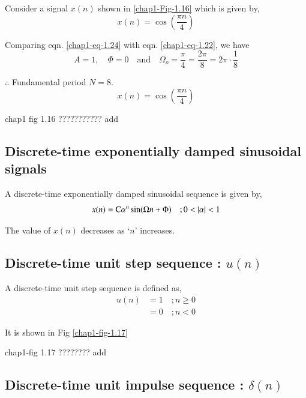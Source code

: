 Consider a signal $x(n)$ shown in \ref{chap1-Fig-1.16} which is given by,
\begin{equation}
x(n)= \cos\left(\dfrac{\pi n}{4}\right)\label{chap1-eq-1.24}
\end{equation}

Comparing eqn. \ref{chap1-eq-1.24} with eqn. \ref{chap1-eq-1.22}, we have
$$
A = 1, \quad \Phi = 0 \quad \text{and}\quad \Omega_{o} = \dfrac{\pi}{4} = \dfrac{2\pi}{ 8} = 2\pi\cdot \dfrac{1}{8} 
$$

$\therefore$ Fundamental period $N = 8$.
$$
x(n)= \cos \left(\dfrac{\pi n}{4} \right)
$$

\begin{center}
 chap1 fig 1.16 ??????????? add
\end{center}


\subsection{Discrete-time exponentially damped sinusoidal signals}\label{chap1-subsec-1.4.3}

A discrete-time exponentially damped sinusoidal sequence  is given by,
\begin{equation}
x(n) = \textrm{C} \alpha^{n} \sin(\Omega n + \Phi) \quad ; 0 < |\alpha| < 1 \label{chap1-eq-1.25}
\end{equation}

The value of $x(n)$ decreases as `$n$' increases.

\subsection{Discrete-time unit step sequence : $u(n)$}\label{chap1-subsec-1.4.4}

A discrete-time unit step sequence is defined as,
\begin{align*}
u(n) &= 1 \quad ; n \geq 0\\
&= 0\quad ; n < 0
\end{align*}

It is shown in Fig \ref{chap1-fig-1.17}
\begin{center}
chap1-fig 1.17 ???????? add
\end{center}

\subsection{Discrete-time unit impulse sequence : $\delta(n)$}\label{chap1-subsec-1.4.5}

